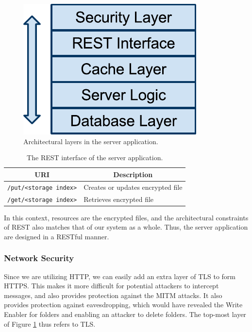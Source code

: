 \documentclass[pdftex,english,10pt,b5paper,twoside]{book}
\begin{document}
\begin{figure}[h!]
    \centering
    \includegraphics[scale=0.6]{ImplementationServerLayers.pdf}
    \caption{Architectural layers in the server application.}
    \label{fig:IM:layers}
\end{figure}

\begin{table}[h!]
    \centering
    \caption{The \acs{REST} interface of the server application.}
    \begin{tabular}{|l|l|}
        \hline
        \multicolumn{1}{|c}{\textbf{\acs{URI}}} & \multicolumn{1}{|c|}{\textbf{Description}} \\
        \hline
        \texttt{/put/<storage index>} & Creates or updates encrypted file \\
        \hline
        \texttt{/get/<storage index>} & Retrieves encrypted file \\
        \hline
    \end{tabular}
    \label{tbl:IM:restinterface}
\end{table}

In this context, resources are the encrypted files, and the architectural
constraints of \ac{REST} also matches that of our system as a
whole. Thus, the server application are designed in a \acs{REST}ful manner.

\subsubsection{Network Security} Since we are utilizing \ac{HTTP}, we can
easily add an extra layer of \ac{TLS} to form \ac{HTTPS}. This makes it more
difficult for potential attackers to intercept messages, and also provides
protection against the \ac{MITM} attacks. It also provides protection against
eavesdropping, which would have revealed the Write Enabler for folders and
enabling an attacker to delete folders. The top-most layer of Figure
\ref{fig:IM:layers} thus refers to \ac{TLS}.
\end{document}
